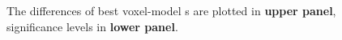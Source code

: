 \begin{figure}
    \centering
    \caption[- Contrast, Group]{The differences of best voxel-model s are plotted in \textbf{upper panel}, significance levels in \textbf{lower panel}.} 
    \label{fig:EMB_SIG_ASN_ContrastMapG}
\end{figure}


